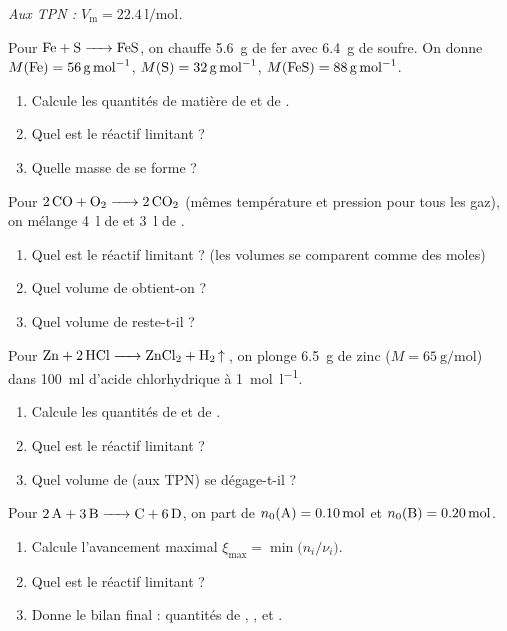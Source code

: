 \documentclass[11pt,a4paper]{article}
\begin{document}
\begin{center}\small\itshape
Aux TPN : $V_{\mathrm{m}}=\qty{22.4}{\litre\per\mole}$.
\end{center}

\begin{exo}
Pour $\ce{Fe + S -> FeS}$, on chauffe \qty{5.6}{\gram} de fer avec \qty{6.4}{\gram} de soufre.
On donne $M(\ce{Fe})=\qty{56}{\gram\per\mole}$, $M(\ce{S})=\qty{32}{\gram\per\mole}$,
$M(\ce{FeS})=\qty{88}{\gram\per\mole}$.
\begin{enumerate}[label=\alph*)]
  \item Calcule les quantités de matière de  et de .
  \item Quel est le réactif limitant ?
  \item Quelle masse de  se forme ?
\end{enumerate}
\end{exo}

\begin{exo}
Pour $\ce{2 CO + O2 -> 2 CO2}$ (mêmes température et pression pour tous les gaz), on mélange
\qty{4}{\litre} de  et \qty{3}{\litre} de .
\begin{enumerate}[label=\alph*)]
  \item Quel est le réactif limitant ? (les volumes se comparent comme des moles)
  \item Quel volume de  obtient-on ?
  \item Quel volume de  reste-t-il ?
\end{enumerate}
\end{exo}

\begin{exo}
Pour $\ce{Zn + 2 HCl -> ZnCl2 + H2 ^}$, on plonge \qty{6.5}{\gram} de zinc
($M=\qty{65}{\gram\per\mole}$) dans \qty{100}{\milli\litre} d'acide chlorhydrique à
\qty{1}{\mole\per\litre}.
\begin{enumerate}[label=\alph*)]
  \item Calcule les quantités de  et de .
  \item Quel est le réactif limitant ?
  \item Quel volume de  (aux TPN) se dégage-t-il ?
\end{enumerate}
\end{exo}

\begin{exo}
Pour $\ce{2 A + 3 B -> C + 6 D}$, on part de $n_0(\ce{A})=\qty{0.10}{\mole}$ et
$n_0(\ce{B})=\qty{0.20}{\mole}$.
\begin{enumerate}[label=\alph*)]
  \item Calcule l'avancement maximal $\xi_{\max}=\min\!\big(n_i/\nu_i\big)$.
  \item Quel est le réactif limitant ?
  \item Donne le bilan final : quantités de , ,  et .
\end{enumerate}
\end{exo}
\end{document}
